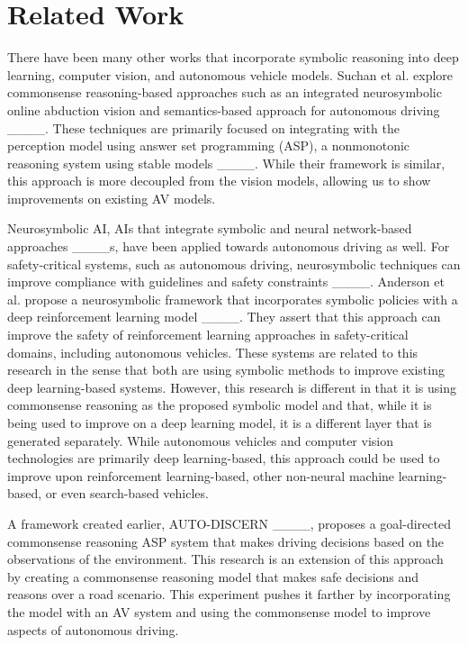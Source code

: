 \section{Related Work}
There have been many other works that incorporate symbolic reasoning into deep learning, computer vision, and autonomous vehicle models. Suchan et al. explore commonsense reasoning-based approaches such as an integrated neurosymbolic online abduction vision and semantics-based approach for autonomous driving ____. These techniques are primarily focused on integrating with the perception model using answer set programming (ASP), a nonmonotonic reasoning system using stable models ____. While their framework is similar, this approach is more decoupled from the vision models, allowing us to show improvements on existing AV models.

Neurosymbolic AI, AIs that integrate symbolic and neural network-based approaches ____s, have been applied towards autonomous driving as well. For safety-critical systems, such as autonomous driving, neurosymbolic techniques can improve compliance with guidelines and safety constraints ____. Anderson et al. propose a neurosymbolic framework that incorporates symbolic policies with a deep reinforcement learning model ____. They assert that this approach can improve the safety of reinforcement learning approaches in safety-critical domains, including autonomous vehicles. These systems are related to this research in the sense that both are using symbolic methods to improve existing deep learning-based systems. However, this research is different in that it is using commonsense reasoning as the proposed symbolic model and that, while it is being used to improve on a deep learning model, it is a different layer that is generated separately. While autonomous vehicles and computer vision technologies are primarily deep learning-based, this approach could be used to improve upon reinforcement learning-based, other non-neural machine learning-based, or even search-based vehicles.

A framework created earlier, AUTO-DISCERN ____, proposes a goal-directed commonsense reasoning ASP system that makes driving decisions based on the observations of the environment. This research is an extension of this approach by creating a commonsense reasoning model that makes safe decisions and reasons over a road scenario. This experiment pushes it farther by incorporating the model with an AV system and using the commonsense model to improve aspects of autonomous driving.